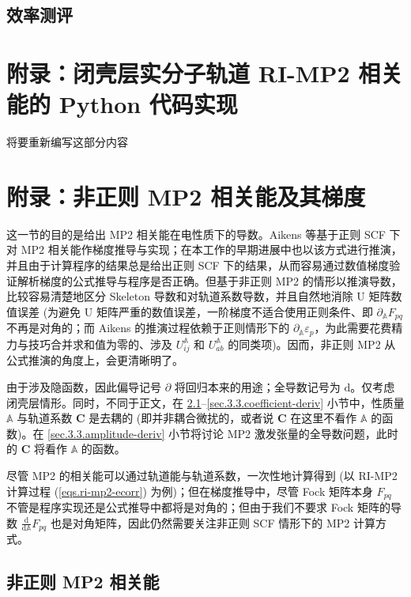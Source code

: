 \subsection{效率测评}

\newpage

\section{附录：闭壳层实分子轨道 RI-MP2 相关能的 Python 代码实现}
\label{sec.3.python-ri-mp2}

\alert{将要重新编写这部分内容}

\section{附录：非正则 MP2 相关能及其梯度}
\label{sec.3.3.non-canonical-mp2-gradient}

这一节的目的是给出 MP2 相关能在电性质下的导数。Aikens 等基于正则 SCF 下对 MP2 相关能作梯度推导与实现\cite{Aikens-Gordon.TCA.2003}；在本工作的早期进展中也以该方式进行推演，并且由于计算程序的结果总是给出正则 SCF 下的结果，从而容易通过数值梯度验证解析梯度的公式推导与程序是否正确。但基于非正则 MP2 的情形以推演导数，比较容易清楚地区分 Skeleton 导数和对轨道系数导数，并且自然地消除 U 矩阵数值误差 (为避免 U 矩阵严重的数值误差，一阶梯度不适合使用正则条件、即 $\partial_{\mathbb{A}} F_{pq}$ 不再是对角的；而 Aikens 的推演过程依赖于正则情形下的 $\partial_{\mathbb{A}} \varepsilon_p$，为此需要花费精力与技巧合并求和值为零的、涉及 $U_{ij}^{\mathbb{A}}$ 和 $U_{ab}^{\mathbb{A}}$ 的同类项)。因而，非正则 MP2 从公式推演的角度上，会更清晰明了。

由于涉及隐函数，因此偏导记号 $\partial$ 将回归本来的用途；全导数记号为 $\mathrm{d}$。仅考虑闭壳层情形。同时，不同于正文，在 \ref{sec.3.3.non-canonical}--\ref{sec.3.3.coefficient-deriv} 小节中，性质量 $\mathbb{A}$ 与轨道系数 $\mathbf{C}$ 是去耦的 (即并非耦合微扰的，或者说 $\mathbf{C}$ 在这里不看作 $\mathbb{A}$ 的函数)。在 \ref{sec.3.3.amplitude-deriv} 小节将讨论 MP2 激发张量的全导数问题，此时的 $\mathbf{C}$ 将看作 $\mathbb{A}$ 的函数。

尽管 MP2 的相关能可以通过轨道能与轨道系数，一次性地计算得到 (以 RI-MP2 计算过程 (\ref{eqs.ri-mp2-ecorr}) 为例)；但在梯度推导中，尽管 Fock 矩阵本身 $F_{pq}$ 不管是程序实现还是公式推导中都将是对角的；但由于我们不要求 Fock 矩阵的导数 $\frac{\mathrm{d}}{\mathrm{d} \mathbb{A}} F_{pq}$ 也是对角矩阵，因此仍然需要关注非正则 SCF 情形下的 MP2 计算方式。

\subsection{非正则 MP2 相关能}
\label{sec.3.3.non-canonical}

